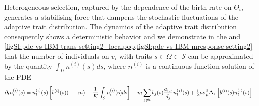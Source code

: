 Heterogeneous selection, captured by the dependence of the birth rate on $\Theta_i$, generates a stabilising force  that dampens the stochastic fluctuations of the adaptive trait distribution. The dynamics of the adaptive trait distribution consequently shows a deterministic behavior and we demonstrate in the  and \cref{figSI:pde-vs-IBM-trans-setting2_localpop,figSI:pde-vs-IBM-mresponse-setting2} that the number of individuals on $v_i$ with traits $s \in \Omega \subset \mathcal{S}$ can be approximated by the quantity $\int_\Omega n^{(i)}(s)ds$, where $n^{(i)}$ is a continuous function solution of the PDE
%
\begin{equation}\label{eq:PDE_adapt}
\begin{split}
  \partial_t n_t^{(i)}(s) &= n_t^{(i)} (s) \left[b^{(i)}(s)(1-m) - \frac{1}{K}\int_\mathcal{S}  n_t^{(i)}({\textbf s}) d{\textbf s}  \right] + m \sum_{j\neq i} b_j(s) \frac{a_{i,j}}{d_j} n_t^{(j)}(s) + \tfrac{1}{2} \mu \sigma_\mu^2 \Delta_s \left[ b^{(i)}(s) n^{(i)}_t(s) \right]
  \end{split}
\end{equation}

